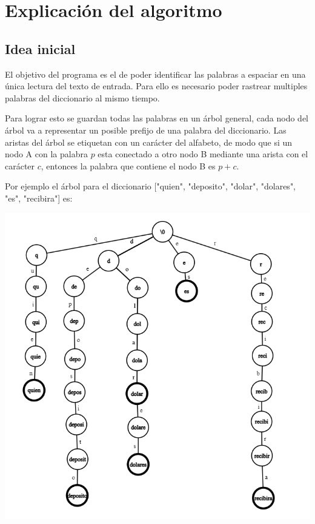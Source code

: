 \documentclass{article}
\begin{document}
\section*{Explicación del algoritmo}

\subsection*{Idea inicial}
El objetivo del programa es el de poder identificar las palabras a espaciar en una única lectura del texto de entrada.
Para ello es necesario poder rastrear multiples palabras del diccionario al mismo tiempo.

Para lograr esto se guardan todas las palabras en un árbol general, cada nodo del árbol va a representar un posible
prefijo de una palabra del diccionario. Las aristas del árbol se etiquetan con un carácter del alfabeto, de modo que si
un nodo A con la palabra $p$ esta conectado a otro nodo B mediante una arista con el carácter $c$, entonces la palabra
que contiene el nodo B es $p+c$.

Por ejemplo el árbol para el diccionario ["quien", "deposito", "dolar", "dolares", "es", "recibira"] es:

\begin{center}
\includegraphics[scale=0.3]{trie1.png}
\end{center}
\end{document}
